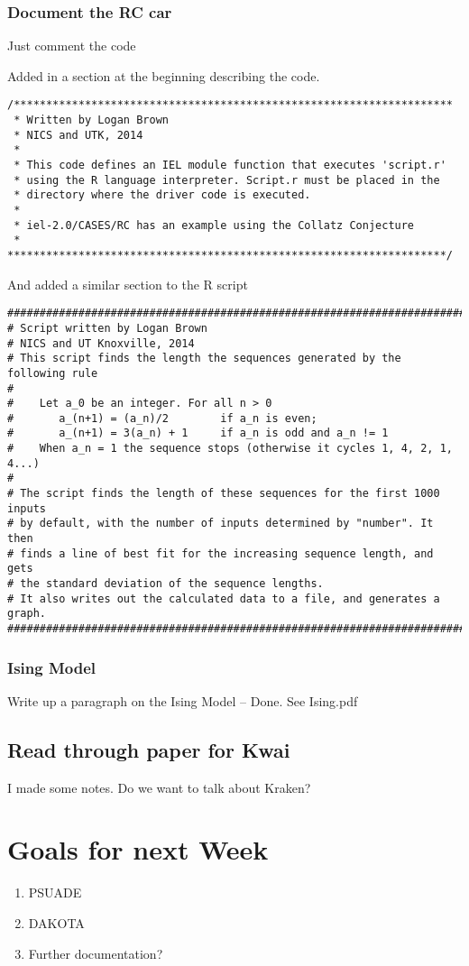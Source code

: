 \subsubsection{Document the RC car}
Just comment the code

Added in a section at the beginning describing the code. 
\begin{verbatim}
/********************************************************************
 * Written by Logan Brown
 * NICS and UTK, 2014
 *
 * This code defines an IEL module function that executes 'script.r'
 * using the R language interpreter. Script.r must be placed in the
 * directory where the driver code is executed.
 *
 * iel-2.0/CASES/RC has an example using the Collatz Conjecture
 *
********************************************************************/
\end{verbatim}

And added a similar section to the R script
\begin{verbatim}
############################################################################
# Script written by Logan Brown
# NICS and UT Knoxville, 2014
# This script finds the length the sequences generated by the following rule
#
#    Let a_0 be an integer. For all n > 0
#       a_(n+1) = (a_n)/2        if a_n is even; 
#       a_(n+1) = 3(a_n) + 1     if a_n is odd and a_n != 1
#    When a_n = 1 the sequence stops (otherwise it cycles 1, 4, 2, 1, 4...)
#
# The script finds the length of these sequences for the first 1000 inputs
# by default, with the number of inputs determined by "number". It then
# finds a line of best fit for the increasing sequence length, and gets
# the standard deviation of the sequence lengths.
# It also writes out the calculated data to a file, and generates a graph.
############################################################################
\end{verbatim}




\subsubsection{Ising Model}
Write up a paragraph on the Ising Model -- Done. See Ising.pdf



\subsection{Read through paper for Kwai}

I made some notes. Do we want to talk about Kraken? 

\section{Goals for next Week}
\begin{enumerate}
\item PSUADE
\item DAKOTA
\item Further documentation?
\end{enumerate}


